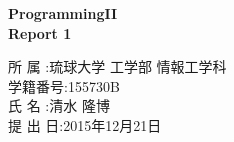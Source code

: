 \documentclass[12pt]{jarticle} %
\begin{document}
\begin{titlepage}
    \begin{center} %
        \fontsize{25pt}{0pt}\selectfont %
        \vspace*{100truept}
        \bf{ProgrammingII}\\ %
        \vspace*{10truept}
        \bf{Report 1}\\ %
        \vspace{340truept}
    \end{center}
    \begin{flushright}
        {\large
            \fontsize{16pt}{0pt}\selectfont
          所  属  :琉球大学 工学部 情報工学科\\
            \vspace{5truept}
          学籍番号:155730B\\
            \vspace{5truept}
          氏  名  :清水 隆博\\
            \vspace{5truept}
          提 出 日:2015年12月21日\\
            \vspace{5truept}
        }    
    \end{flushright}
\end{titlepage}

\tableofcontents %
\setcounter{page}{1} %
\pagestyle{plain}

\newpage
\end{document}
